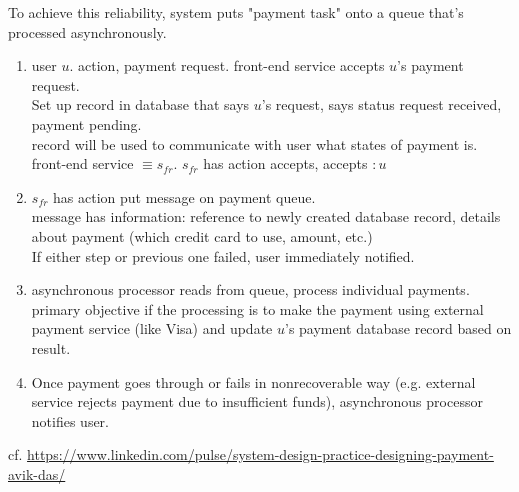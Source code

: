 \documentclass[10pt]{amsart}
\begin{document}
To achieve this reliability, system puts "payment task" onto a queue that's processed asynchronously.

\begin{enumerate}
	\item user $u$. action, payment request. front-end service accepts $u$'s payment request. \\
	Set up record in database that says $u$'s request, says status request received, payment pending. \\
	record will be used to communicate with user what states of payment is. \\
	front-end service $\equiv s_{fr}$. $s_{fr}$ has action accepts, accepts $ : u$
	\item $s_{fr}$ has action put message on payment queue. \\
	message has information: reference to newly created database record, details about payment (which credit card to use, amount, etc.) \\
	If either step or previous one failed, user immediately notified. 
	\item asynchronous processor reads from queue, process individual payments. \\
	primary objective if the processing is to make the payment using external payment service (like Visa) and update $u$'s payment database record based on result.
	\item Once payment goes through or fails in nonrecoverable way (e.g. external service rejects payment due to insufficient funds), asynchronous processor notifies user.
\end{enumerate}

cf. \url{https://www.linkedin.com/pulse/system-design-practice-designing-payment-avik-das/}
\end{document}
